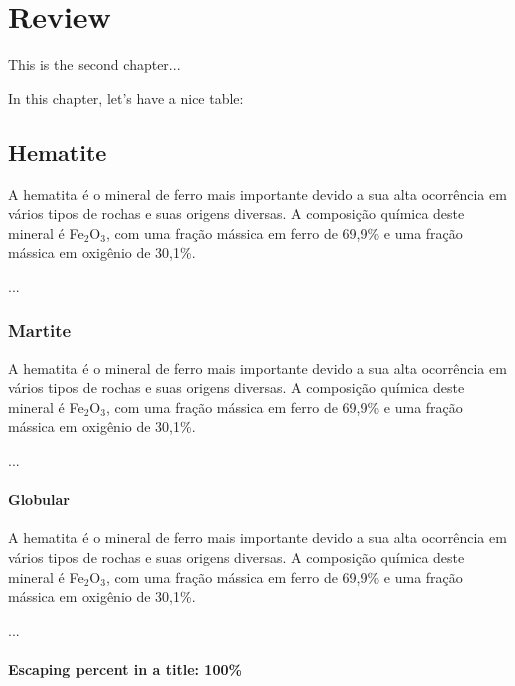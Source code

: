 
\chapter{Review}

This is the second chapter...

In this chapter, let's have a nice table:

%

\section{Hematite}

A hematita é o mineral de ferro mais importante devido a sua alta
ocorrência em vários tipos de rochas e suas origens diversas.\cite{30}
A composição química deste mineral é Fe$_{2}$O$_{3}$, com uma fração
mássica em ferro de 69,9\% e uma fração mássica em oxigênio de
30,1\%.\cite{31}

...


\subsection{Martite}

A hematita é o mineral de ferro mais importante devido a sua alta
ocorrência em vários tipos de rochas e suas origens diversas.\cite{30}
A composição química deste mineral é Fe$_{2}$O$_{3}$, com uma fração
mássica em ferro de 69,9\% e uma fração mássica em oxigênio de
30,1\%.\cite{31}

...


\subsubsection{Globular}

A hematita é o mineral de ferro mais importante devido a sua alta
ocorrência em vários tipos de rochas e suas origens diversas.\cite{30}
A composição química deste mineral é Fe$_{2}$O$_{3}$, com uma fração
mássica em ferro de 69,9\% e uma fração mássica em oxigênio de
30,1\%.\cite{31}

...

\subsubsection{Escaping percent in a title:  100\%}
